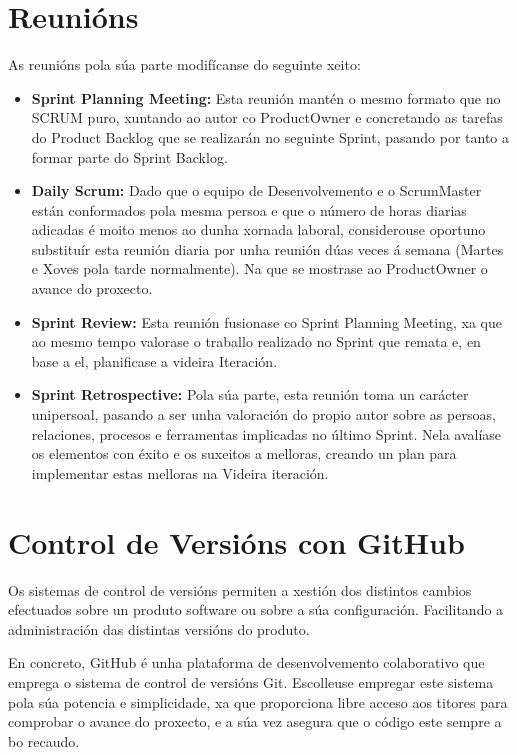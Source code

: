 \section{Reunións}
As reunións pola súa parte modifícanse do seguinte xeito:

\begin{itemize}
	\item{\textbf{Sprint Planning Meeting:}}
	Esta reunión mantén o mesmo formato que no SCRUM puro, xuntando ao autor co	ProductOwner 
	e concretando as tarefas do Product Backlog que se realizarán no seguinte Sprint, pasando
	por tanto a formar parte do Sprint Backlog.
	
	\item{\textbf{Daily Scrum:}}
	Dado que o equipo de Desenvolvemento e o ScrumMaster están conformados pola mesma persoa
	e que o número de horas diarias adicadas é moito menos ao dunha xornada laboral, considerouse
	oportuno substituír esta reunión diaria por unha reunión dúas veces á semana (Martes e Xoves 
	pola tarde normalmente). Na que se mostrase ao ProductOwner o avance do proxecto.
	
	\item{\textbf{Sprint Review:}}
	Esta reunión fusionase co Sprint Planning Meeting, xa que ao mesmo tempo valorase o traballo
	realizado no Sprint que remata e, en base a el, planificase a videira Iteración. 
	
	\item{\textbf{Sprint Retrospective:}}
	Pola súa parte, esta reunión toma un carácter unipersoal, pasando a ser unha valoración do
	propio autor sobre as persoas, relaciones, procesos e ferramentas implicadas no último Sprint.
	Nela avalíase os elementos con éxito e os suxeitos a melloras, creando un plan para implementar
	estas melloras na Videira iteración.
	
\end{itemize}


\section{Control de Versións con GitHub}
	Os sistemas de control de versións permiten a xestión dos distintos cambios efectuados sobre
	un produto software ou sobre a súa configuración. Facilitando a administración das distintas
	versións do produto. 
	
	En concreto, GitHub é unha plataforma de desenvolvemento colaborativo que emprega o sistema de
	control de versións Git. Escolleuse empregar este sistema pola súa potencia e simplicidade, xa
	que proporciona libre acceso aos titores para comprobar o avance do proxecto, e a súa vez asegura
	que o código este sempre a bo recaudo.
	
